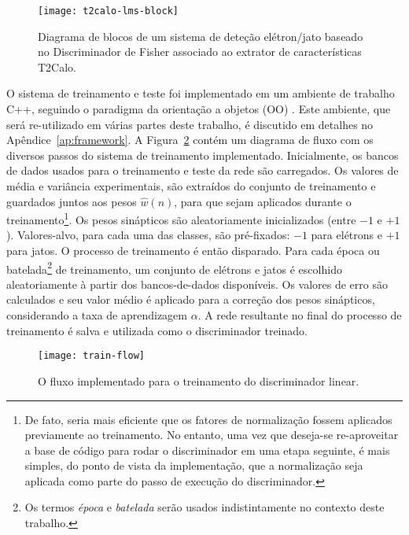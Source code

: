 \begin{figure}
\begin{center}
\texttt{[image: t2calo-lms-block]}
\end{center}
\caption{Diagrama de blocos de um sistema de deteção elétron/jato baseado no
Discriminador de Fisher associado ao extrator de características T2Calo.}
\label{fig:t2calo-lms-block}
\end{figure}

O sistema de treinamento e teste foi implementado em um ambiente de trabalho
C++, seguindo o paradigma da orientação a objetos (OO) \cite{stroustrup,
booch}. Este ambiente, que será re-utilizado em várias partes deste trabalho,
é discutido em detalhes no Apêndice~\ref{ap:framework}. A
Figura~\ref{fig:train-flow} contém um diagrama de fluxo com os diversos passos
do sistema de treinamento implementado. Inicialmente, os bancos de dados
usados para o treinamento e teste da rede são carregados. Os valores de média
e variância experimentais, são extraídos do conjunto de treinamento e
guardados juntos aos pesos $\hat{w}(n)$, para que sejam aplicados durante o
treinamento\footnote{De fato, seria mais eficiente que os fatores de
normalização fossem aplicados previamente ao treinamento. No entanto, uma vez
que deseja-se re-aproveitar a base de código para rodar o discriminador em uma
etapa seguinte, é mais simples, do ponto de vista da implementação, que a
normalização seja aplicada como parte do passo de execução do
discriminador.}. Os pesos sinápticos são aleatoriamente inicializados (entre
$-1$ e $+1$). Valores-alvo, para cada uma das classes, são pré-fixados: $-1$
para elétrons e $+1$ para jatos. O processo de treinamento é então
disparado. Para cada época ou batelada\footnote{Os termos \textit{época} e
\textit{batelada} serão usados indistintamente no contexto deste trabalho.}
de treinamento, um conjunto de elétrons e jatos é escolhido aleatoriamente à
partir dos bancos-de-dados disponíveis. Os valores de erro são calculados e
seu valor médio é aplicado para a correção dos pesos sinápticos, considerando
a taxa de aprendizagem $\alpha$. A rede resultante no final do processo de
treinamento é salva e utilizada como o discriminador treinado.

\begin{figure}
\begin{center}
\texttt{[image: train-flow]}
\end{center}
\caption{O fluxo implementado para o treinamento do discriminador linear.}
\label{fig:train-flow}
\end{figure}

